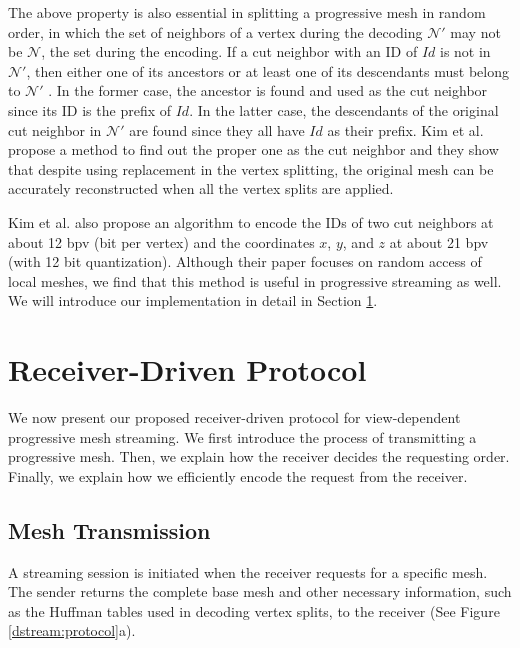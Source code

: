    The above property is also essential in splitting
    a progressive mesh in random order, in which the set of neighbors of a vertex
    during the decoding $\mathcal{N}'$ may not be $\mathcal{N}$, the set 
    during the encoding. If a cut neighbor with an ID of $Id$ %
    is not in $\mathcal{N}'$, then either one of its 
    ancestors or at least one of its descendants must belong to $\mathcal{N}'$ \cite{multiresolution:kim}.
    In the former case, the ancestor is found and used as 
    the cut neighbor since its ID is the prefix of $Id$.  
    In the latter case, the descendants of the original 
    cut neighbor in $\mathcal{N}'$ are found since they all have $Id$ as their prefix.
    Kim et al. \cite{multiresolution:kim} propose a method to find out the 
    proper one as the cut neighbor and they show that despite using replacement
    in the vertex splitting, the original mesh can be 
    accurately reconstructed when all the vertex splits are applied.

    Kim et al. \cite{multiresolution:kim} also propose an algorithm
    to encode the IDs of two cut neighbors at about 12 bpv (bit per vertex) 
    and the coordinates $x$, $y$, and $z$ at about 21 bpv (with 12 bit quantization).
    Although their paper focuses on random access of local meshes, we find that this 
	method is useful in progressive streaming as well. 
    We will introduce our implementation in detail in Section \ref{s:dstream:protocol}.

\section{Receiver-Driven Protocol}
     \label{s:dstream:protocol}
	 We now present our proposed receiver-driven protocol
     for view-dependent progressive mesh streaming.
     We first introduce the process of transmitting 
     a progressive mesh. Then, we explain how the receiver decides the requesting order.
     Finally, we explain how we efficiently encode the request from the receiver.
     
     \subsection{Mesh Transmission} 
     A streaming session is initiated when the receiver requests for a specific
     mesh.
     The sender returns the complete base mesh and other necessary information,
     such as the Huffman tables used in decoding vertex splits, to the receiver
     (See Figure \ref{dstream:protocol}a).
     
